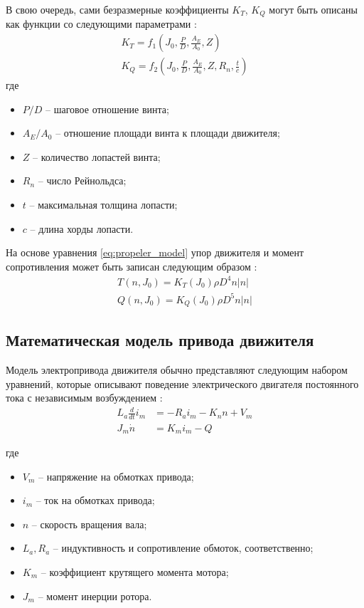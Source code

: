 В свою очередь, сами безразмерные коэффициенты $K_T$, $K_Q$ могут быть описаны как функции со следующими параметрами \cite{oosterveld1975further}:
\begin{gather*}
    K_T = f_1 \left( J_0, \frac{P}{D}, \frac{A_E}{A_0}, Z \right) \\
    K_Q = f_2 \left( J_0, \frac{P}{D}, \frac{A_E}{A_0}, Z, R_n, \frac{t}{c} \right) 
\end{gather*}
\noindent где
\begin{itemize}
    \item $P/D$ -- шаговое отношение винта;
    \item $A_E/A_0$ -- отношение площади винта к площади движителя;
    \item $Z$ -- количество лопастей винта;
    \item $R_n$ -- число Рейнольдса;
    \item $t$ -- максимальная толщина лопасти;
    \item $c$ -- длина хорды лопасти.
\end{itemize}

На основе уравнения \ref{eq:propeler_model} упор движителя и момент сопротивления может быть записан следующим образом \cite{пантов1973основы}:
\begin{equation}
    \label{eq:kt_kq}
    \begin{array}{l}
        T(n, J_0) = K_T (J_0) \rho D^4 n |n|\\
        Q(n, J_0) = K_Q (J_0) \rho D^5 n |n|
    \end{array}
\end{equation}

\subsection{Математическая модель привода движителя}

Модель электропривода движителя обычно представляют следующим набором уравнений, которые описывают поведение электрического двигателя постоянного тока с независимым возбуждением \cite{zhao2015torque}:
\begin{equation}
	\label{eq:motor_model}
	\begin{array}{ll}
	L_a\frac{d}{dt}i_m &=-R_ai_m-K_n n + V_m \\
    J_m\dot{n} &= K_m i_m - Q
	\end{array}
\end{equation}

\noindent где
\begin{itemize}
    \item $V_m$ -- напряжение на обмотках привода;
    \item $i_m$ -- ток на обмотках привода;
    \item $n$ -- скорость вращения вала;
    \item $L_a, R_a$ -- индуктивность и сопротивление обмоток, соответственно;
    \item $K_m$ -- коэффициент крутящего момента мотора;
    \item $J_m$ -- момент инерции ротора.
\end{itemize}


